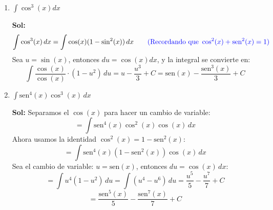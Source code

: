 \documentclass[letterpaper,12pt]{article}
\theoremstyle{plain}
\theoremstyle{definition}
\newcommand{\sen}{\text{sen}}
\begin{document}
\begin{enumerate}
\begin{enumerate}
\color{blue}
\textbf{Sol:} \begin{align*}
\int \tan^{3}(x)\tan^{2}(x)dx &= \int \tan^{3}(x)(\sec^{2}(x)-1)dx \\
&= \int (\tan^{3}(x)\sec^{2}(x) - \tan^{3}(x))dx \\
&= \int \tan^{3}(x)\sec^{2}(x)dx - \int \tan^{3}(x)dx \\
&= \int \tan^{3}(x)\sec^{2}(x)dx - \int \tan(x)(\sec^{2}(x)-1)dx \\
&= \int \tan^{3}(x)\sec^{2}(x)dx - \int \tan(x)\sec^{2}(x)dx + \int \tan(x)dx
\end{align*}
Para las dos primeras integrales, usamos la sustituci\'on $u = \tan(x)$, $du = \sec^{2}(x)dx$:
$$ = \int u^{3}du - \int u du $$
Para la \'ultima integral, usamos $\int \tan(x)dx = \int \frac{\sin x}{\cos x}dx$. Haciendo la sustituci\'on $v = \cos x$, $dv = -\sin x dx$, obtenemos:
$$ \int \frac{-dv}{v} = -\ln|v| $$
Juntando todo:
$$ = \frac{u^{4}}{4} - \frac{u^{2}}{2} - \ln|v| + C $$
Sustituyendo de vuelta $u = \tan x$ y $v = \cos x$:
$$ = \frac{\tan^{4}x}{4} - \frac{\tan^{2}x}{2} - \ln|\cos x| + C. $$
\color{black}
\item $\displaystyle \int \cos^3(x) dx$

\color{blue}
\textbf{Sol:} 
\[
\int \cos^3(x) \, dx = \int \cos(x)(1 - \sin^2(x)) \, dx \quad \quad \textcolor{blue}{\text{(Recordando que}\ \cos^2(x) + \sen^2(x)=1)}
\]
Sea \( u = \sin(x) \), entonces \( du = \cos(x) dx \), y la integral se convierte en:
\[
\int \frac{\cos(x)}{\cos(x)} \cdot (1 - u^2) \, du = u - \frac{u^3}{3} + C = \sen(x) - \frac{\sen^3(x)}{3} + C
\]
\color{black}
\item $\displaystyle \int \sen^4(x) \cos^3(x) \, dx$

\color{blue}
\textbf{Sol:} Separamos el \(\cos(x)\) para hacer un cambio de variable:
\[
= \int \sen^4(x) \cos^2(x) \cos(x) \, dx
\]
Ahora usamos la identidad \(\cos^2(x) = 1 - \sen^2(x)\):
\[
= \int \sen^4(x) (1 - \sen^2(x)) \cos(x) \, dx
\]
Sea el cambio de variable: \( u = \sen(x) \), entonces \( du = \cos(x)\, dx \):
\[
= \int u^4 (1 - u^2) \, du
= \int (u^4 - u^6) \, du = \frac{u^5}{5} - \frac{u^7}{7} + C
\]
\[
= \frac{\sen^5(x)}{5} - \frac{\sen^7(x)}{7} + C
\]

\color{black}
\end{enumerate}
\end{enumerate}
\end{document}
